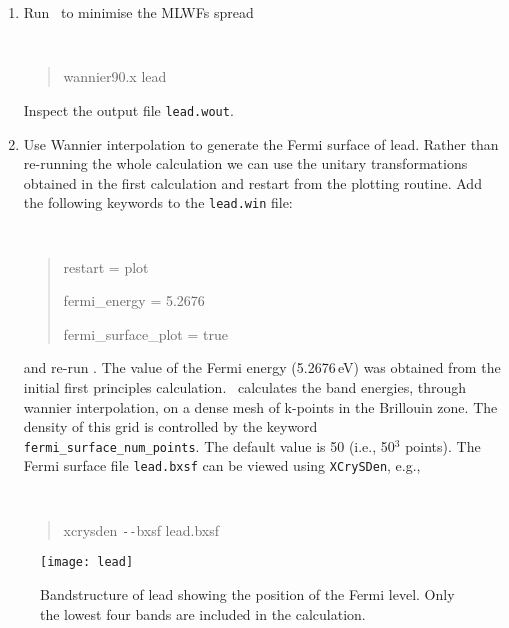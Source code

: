 \documentclass[a4paper,11pt,twoside]{article}
\begin{document}
\begin{enumerate}
\item Run \wannier\ to minimise the MLWFs spread
{\tt
\begin{quote}
wannier90.x lead
\end{quote} }
Inspect the output file {\tt lead.wout}.
\item Use Wannier interpolation to generate the Fermi surface of
  lead. Rather than re-running the whole calculation we can use the
  unitary transformations obtained in the first calculation and
  restart from the plotting routine. Add the following keywords to the
  {\tt lead.win} file: {\tt
\begin{quote}
restart = plot

fermi\_energy = 5.2676

fermi\_surface\_plot = true
\end{quote} } and re-run \wannier. The value of the Fermi energy
(5.2676\,eV) was obtained from the initial first principles
calculation. \wannier\ calculates the band energies, through wannier
interpolation, on a dense mesh of k-points in the Brillouin zone. The
density of this grid is controlled by the keyword {\tt
  fermi\_surface\_num\_points}. The default value is 50 (i.e., 50$^3$
points).  The Fermi surface file {\tt lead.bxsf} can be viewed using
{\tt XCrySDen}, e.g., 
%
{\tt
\begin{quote}
xcrysden \texttt{-{}-}bxsf lead.bxsf
\end{quote} }
\end{enumerate}

\begin{figure}[h]
\begin{center}
\texttt{[image: lead]}
\caption{Bandstructure of lead showing the position of the Fermi
  level. Only the lowest four bands are included in the calculation.} 
\label{fig:pb-bnd}
\end{center}
\end{figure}



\end{document}
